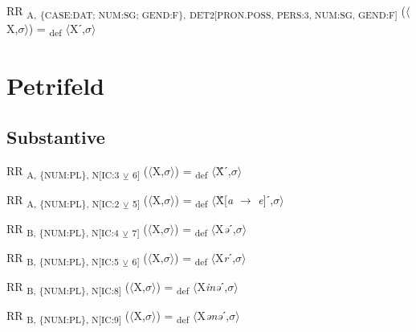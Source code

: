 {\begin{exe}
 RR \textsubscript{A,} \textsubscript{\{CASE:DAT; NUM:SG; GEND:F\},} \textsubscript{DET2[PRON.POSS, PERS:3, NUM:SG, GEND:F]} ($\langle$X,$\sigma $$\rangle$) = \textsubscript{def} $\langle$Xˊ,$\sigma $$\rangle$
\end{exe}

\section{Petrifeld}

\subsection{Substantive}

\begin{exe}
 RR \textsubscript{A, \{NUM:PL\}, N[IC:3} \textsubscript{${\veebar}$}\textsubscript{ 6]} ($\langle$X,$\sigma $$\rangle$) = \textsubscript{def} $\langle$Ẍˊ,$\sigma $$\rangle$
\end{exe}

\begin{exe}
 RR \textsubscript{A, \{NUM:PL\}, N[IC:2} \textsubscript{${\veebar}$}\textsubscript{ 5]} ($\langle$X,$\sigma $$\rangle$) = \textsubscript{def} $\langle$Ẍ[\textit{a} $\rightarrow$ \textit{e}]ˊ,$\sigma $$\rangle$
\end{exe}

\begin{exe}
 RR \textsubscript{B, \{NUM:PL\}, N[IC:4} \textsubscript{${\veebar}$}\textsubscript{ 7]} ($\langle$X,$\sigma $$\rangle$) = \textsubscript{def} $\langle$X\textit{ə}ˊ,$\sigma $$\rangle$
\end{exe}

\begin{exe}
 RR \textsubscript{B, \{NUM:PL\}, N[IC:5} \textsubscript{${\veebar}$}\textsubscript{ 6]} ($\langle$X,$\sigma $$\rangle$) = \textsubscript{def} $\langle$X\textit{r}ˊ,$\sigma $$\rangle$
\end{exe}

\begin{exe}
 RR \textsubscript{B, \{NUM:PL\}, N[IC:8]} ($\langle$X,$\sigma $$\rangle$) = \textsubscript{def} $\langle$X\textit{inə}ˊ,$\sigma $$\rangle$
\end{exe}

\begin{exe}
 RR \textsubscript{B, \{NUM:PL\}, N[IC:9]} ($\langle$X,$\sigma $$\rangle$) = \textsubscript{def} $\langle$X\textit{ənə}ˊ,$\sigma $$\rangle$
\end{exe}

}
